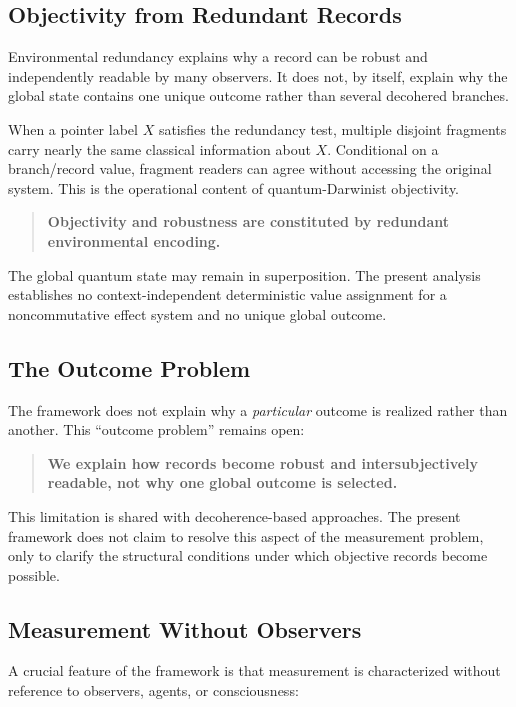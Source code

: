 \documentclass[12pt,a4paper,openany]{book}
\begin{document}
\subsection{Objectivity from Redundant Records}

Environmental redundancy explains why a record can be robust and independently readable by many observers.  It does not, by itself, explain why the global state contains one unique outcome rather than several decohered branches.

When a pointer label $X$ satisfies the redundancy test, multiple disjoint fragments carry nearly the same classical information about $X$.  Conditional on a branch/record value, fragment readers can agree without accessing the original system.  This is the operational content of quantum-Darwinist objectivity.

\begin{quote}
\textbf{Objectivity and robustness are constituted by redundant environmental encoding.}
\end{quote}

The global quantum state may remain in superposition.  The present analysis establishes no context-independent deterministic value assignment for a noncommutative effect system and no unique global outcome.

\subsection{The Outcome Problem}

The framework does not explain why a \emph{particular} outcome is realized rather than another. This ``outcome problem'' remains open:

\begin{quote}
\textbf{We explain how records become robust and intersubjectively readable, not why one global outcome is selected.}
\end{quote}

This limitation is shared with decoherence-based approaches. The present framework does not claim to resolve this aspect of the measurement problem, only to clarify the structural conditions under which objective records become possible.

\subsection{Measurement Without Observers}

A crucial feature of the framework is that measurement is characterized without reference to observers, agents, or consciousness:
\end{document}
